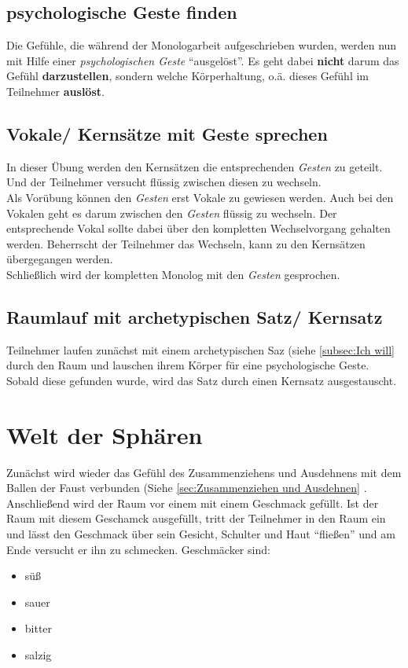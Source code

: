 \documentclass[ngerman, a4paper, twoside]{scrbook}%
\begin{document}
	\subsection{psychologische Geste finden}
	Die Gefühle, die während der Monologarbeit aufgeschrieben wurden, werden nun mit Hilfe einer \emph{psychologischen Geste} "`ausgelöst"'. Es geht dabei \textbf{nicht} darum das Gefühl \textbf{darzustellen}, sondern welche Körperhaltung, o.ä. dieses Gefühl im Teilnehmer \textbf{auslöst}.
	\subsection{Vokale/ Kernsätze mit Geste sprechen}
	In dieser Übung werden den Kernsätzen die entsprechenden \emph{Gesten} zu geteilt. Und der Teilnehmer versucht flüssig zwischen diesen zu wechseln.\\
	Als Vorübung können den \emph{Gesten} erst Vokale zu gewiesen werden. Auch bei den Vokalen geht es darum zwischen den \emph{Gesten} flüssig zu wechseln. Der entsprechende Vokal sollte dabei über den kompletten Wechselvorgang gehalten werden. Beherrscht der Teilnehmer das Wechseln, kann zu den Kernsätzen  übergegangen werden.\\
	Schließlich wird der kompletten Monolog mit den \emph{Gesten} gesprochen.
	\subsection{Raumlauf mit archetypischen Satz/ Kernsatz}
	Teilnehmer laufen zunächst mit einem archetypischen Saz (siehe \ref{subsec:Ich will}  durch den Raum und lauschen ihrem Körper für eine psychologische Geste. Sobald diese gefunden wurde, wird das Satz durch einen Kernsatz ausgestauscht.



	\section{Welt der Sphären}
	Zunächst wird wieder das Gefühl des Zusammenziehens und Ausdehnens mit dem Ballen der Faust verbunden (Siehe \ref{sec:Zusammenziehen und Ausdehnen} . Anschließend wird der Raum vor einem mit einem Geschmack gefüllt. Ist der Raum mit diesem Geschamck ausgefüllt, tritt der Teilnehmer in den Raum ein und lässt den Geschmack über sein Gesicht, Schulter und Haut "`fließen"' und am Ende versucht er ihn zu schmecken.
	Geschmäcker sind:
	\begin{itemize}
		\item süß
		\item sauer
		\item bitter
		\item salzig
	\end{itemize}
\end{document}
